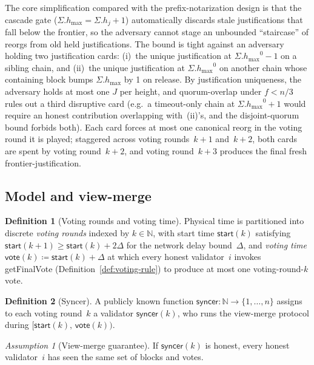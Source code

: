 \ifx\litemode\undefined\documentclass{article}\fi
\newcommand{\hmax}{\ensuremath{h_{\max}}\xspace}
\newcommand{\start}{\ensuremath{\mathsf{start}}}
\newcommand{\vote}{\ensuremath{\mathsf{vote}}}
\newcommand{\syncer}{\textsf{syncer}\xspace}
\newcommand{\getFinalVote}{\textsf{getFinalVote}\xspace}
\theoremstyle{plain}
\theoremstyle{definition}
\newtheorem{definition}{Definition}
\theoremstyle{remark}
\newtheorem{assumption}[theorem]{Assumption}
\begin{document}
The core simplification compared with the prefix-notarization design is that the cascade gate ($\Sigma.\hmax = \Sigma.h_j + 1$) automatically discards stale justifications that fall below the frontier, so the adversary cannot stage an unbounded ``staircase'' of reorgs from old held justifications.
The bound is tight against an adversary holding two justification cards: (i)~the unique justification at $\Sigma.\hmax^0 - 1$ on a sibling chain, and (ii)~the unique justification at $\Sigma.\hmax^0$ on another chain whose containing block bumps $\Sigma.\hmax$ by 1 on release.
By justification uniqueness, the adversary holds at most one $J$ per height, and quorum-overlap under $f < n/3$ rules out a third disruptive card (e.g.\ a timeout-only chain at $\Sigma.\hmax^0 + 1$ would require an honest contribution overlapping with~(ii)'s, and the disjoint-quorum bound forbids both).
Each card forces at most one canonical reorg in the voting round it is played; staggered across voting rounds~$k+1$ and~$k+2$, both cards are spent by voting round~$k+2$, and voting round~$k+3$ produces the final fresh frontier-justification.

\subsection{Model and view-merge}

\begin{definition}[Voting rounds and voting time]\label{def:slots}
Physical time is partitioned into discrete \emph{voting rounds} indexed by $k \in \mathbb{N}$, with start time $\start(k)$ satisfying $\start(k+1) \geq \start(k) + 2\Delta$ for the network delay bound~$\Delta$, and \emph{voting time} $\vote(k) \coloneqq \start(k) + \Delta$ at which every honest validator~$i$ invokes \getFinalVote{} (Definition~\ref{def:voting-rule}) to produce at most one voting-round-$k$ vote.
\end{definition}

\begin{definition}[Syncer]\label{def:syncer}
A publicly known function $\syncer \colon \mathbb{N} \to \{1, \ldots, n\}$ assigns to each voting round~$k$ a validator $\syncer(k)$, who runs the view-merge protocol during $[\start(k),\, \vote(k))$.
\end{definition}

\begin{assumption}[View-merge guarantee]\label{ass:view-merge}
If $\syncer(k)$ is honest, every honest validator~$i$ has seen the same set of blocks and votes.
\end{assumption}
\end{document}
